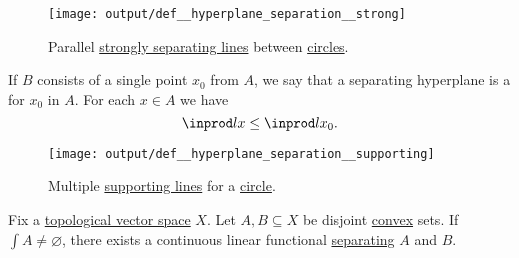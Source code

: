 \begin{definition}
\begin{thmenum}
    \begin{figure}[!ht]
      \centering
      \texttt{[image: output/def\_\_hyperplane\_separation\_\_strong]}
      \caption{Parallel \hyperref[def:hyperplane_separation/strong]{strongly separating lines} between \hyperref[def:circle]{circles}.}\label{fig:def:hyperplane_separation/strong}
    \end{figure}

     If \( B \) consists of a single point \( x_0 \) from \( A \), we say that a separating hyperplane is a  for \( x_0 \) in \( A \). For each \( x \in A \) we have
    \begin{equation}\label{eq:def:hyperplane_separation/supporting}
      \inprod l x \leq \inprod l {x_0}.
    \end{equation}

    \begin{figure}[!ht]
      \centering
      \texttt{[image: output/def\_\_hyperplane\_separation\_\_supporting]}
      \caption{Multiple \hyperref[def:hyperplane_separation/supporting]{supporting lines} for a \hyperref[def:circle]{circle}.}\label{fig:def:hyperplane_separation/supporting}
    \end{figure}
  \end{thmenum}
\end{definition}

\begin{theorem}\label{thm:hahn_banach_hyperplane_separation}
  Fix a \hyperref[def:topological_vector_space]{topological vector space} \( X \). Let \( A, B \subseteq X \) be disjoint \hyperref[def:convex_hull]{convex} sets. If \( \int{A} \neq \varnothing \), there exists a continuous linear functional \hyperref[def:hyperplane_separation]{separating} \( A \) and \( B \).
\end{theorem}
